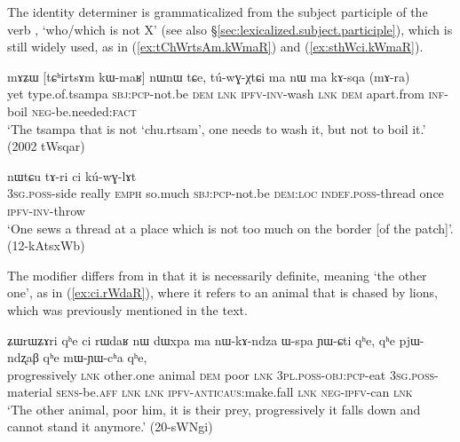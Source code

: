 The identity determiner  is grammaticalized from the subject participle of the verb ,  `who/which is not X' (see also §\ref{sec:lexicalized.subject.participle}), which is still widely used, as in (\ref{ex:tChWrtsAm.kWmaR}) and (\ref{ex:sthWci.kWmaR}).



\begin{exe}
\ex \label{ex:tChWrtsAm.kWmaR}
\gll mɤʑɯ [tɕʰirtsɤm kɯ-maʁ] nɯnɯ tɕe, tú-wɣ-χtɕi ma nɯ ma kɤ-sqa (mɤ-ra) \\
yet type.of.tsampa \textsc{sbj}:\textsc{pcp}-not.be \textsc{dem} \textsc{lnk} \textsc{ipfv}-\textsc{inv}-wash \textsc{lnk} \textsc{dem} apart.from \textsc{inf}-boil \textsc{neg}-be.needed:\textsc{fact} \\
\glt `The tsampa that is not `chu.rtsam', one needs to wash it, but not to boil it.' (2002 tWsqar)
\end{exe}

\begin{exe}
\ex \label{ex:sthWci.kWmaR}
 nɯtɕu tɤ-ri ci kú-wɣ-lɤt \\
\textsc{3sg}.\textsc{poss}-side really \textsc{emph} so.much \textsc{sbj}:\textsc{pcp}-not.be \textsc{dem}:\textsc{loc} \textsc{indef}.\textsc{poss}-thread once \textsc{ipfv}-\textsc{inv}-throw \\
\glt `One sews a thread at a place which is not too much on the border [of the patch]'. (12-kAtsxWb)
\end{exe}

The modifier  differs from  in that it is necessarily definite, meaning `the other one', as in (\ref{ex:ci.rWdaR}), where it refers to an animal that is chased by lions, which was previously mentioned in the text.

\begin{exe}
\ex \label{ex:ci.rWdaR}
\gll ʑɯrɯʑɤri qʰe ci rɯdaʁ nɯ dɯxpa ma nɯ-kɤ-ndza ɯ-spa ɲɯ-ɕti qʰe, qʰe pjɯ-ndʐaβ qʰe mɯ-ɲɯ-cʰa qʰe, \\
progressively \textsc{lnk} other.one animal \textsc{dem} poor \textsc{lnk} \textsc{3pl}.\textsc{poss}-\textsc{obj}:\textsc{pcp}-eat \textsc{3sg}.\textsc{poss}-material \textsc{sens}-be.\textsc{aff} \textsc{lnk} \textsc{lnk} \textsc{ipfv}-\textsc{anticaus}:make.fall \textsc{lnk} \textsc{neg}-\textsc{ipfv}-can \textsc{lnk} \\
\glt `The other animal, poor him, it is their prey, progressively it falls down and cannot stand it anymore.' (20-sWNgi)
\end{exe}


